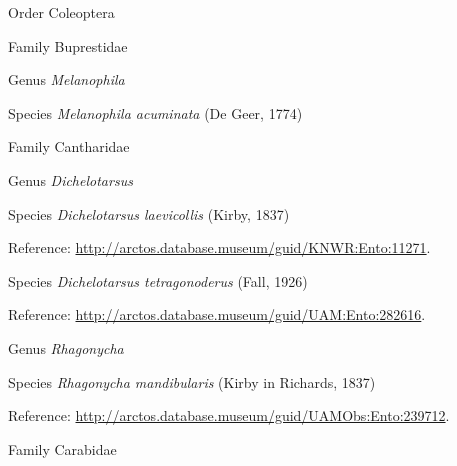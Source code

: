 \documentclass[9pt, article]{memoir}
\begin{document}
\begin{multicols}{2}
\vspace{6pt}\noindent\hspace{18pt}Order Coleoptera


\vspace{6pt}\noindent\hspace{24pt}Family Buprestidae


\vspace{6pt}\noindent\hspace{30pt}Genus \textit{Melanophila}


\vspace{6pt}\noindent\hspace{36pt}Species \textit{Melanophila acuminata} (De Geer, 1774)


\vspace{6pt}\noindent\hspace{24pt}Family Cantharidae


\vspace{6pt}\noindent\hspace{30pt}Genus \textit{Dichelotarsus}


\vspace{6pt}\noindent\hspace{36pt}Species \textit{Dichelotarsus laevicollis} (Kirby, 1837)


\vspace{6pt}Reference: 
\url{http://arctos.database.museum/guid/KNWR:Ento:11271}.

\vspace{6pt}\noindent\hspace{36pt}Species \textit{Dichelotarsus tetragonoderus} (Fall, 1926)


\vspace{6pt}Reference: 
\url{http://arctos.database.museum/guid/UAM:Ento:282616}.

\vspace{6pt}\noindent\hspace{30pt}Genus \textit{Rhagonycha}


\vspace{6pt}\noindent\hspace{36pt}Species \textit{Rhagonycha mandibularis} (Kirby in Richards, 1837)


\vspace{6pt}Reference: 
\url{http://arctos.database.museum/guid/UAMObs:Ento:239712}.

\vspace{6pt}\noindent\hspace{24pt}Family Carabidae



\end{multicols}
\end{document}
